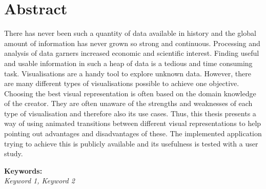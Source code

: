 \section*{Abstract}

There has never been such a quantity of data available in history and the global amount of information has never grown so strong and continuous. Processing and analysis of data garners increased economic and scientific interest. Finding useful and usable information in such a heap of data is a tedious and time consuming task. Visualisations are a handy tool to explore unknown data. However, there are many different types of visualisations possible to achieve one objective. Choosing the best visual representation is often based on the domain knowledge of the creator. They are often unaware of the strengths and weaknesses of each type of visualisation and therefore also its use cases. Thus, this thesis presents a way of using animated transitions between different visual representations to help pointing out advantages and disadvantages of these. The implemented application trying to achieve this is publicly available and its usefulness is tested with a user study.


\textbf{Keywords:}\\
\textit{Keyword 1, Keyword 2}